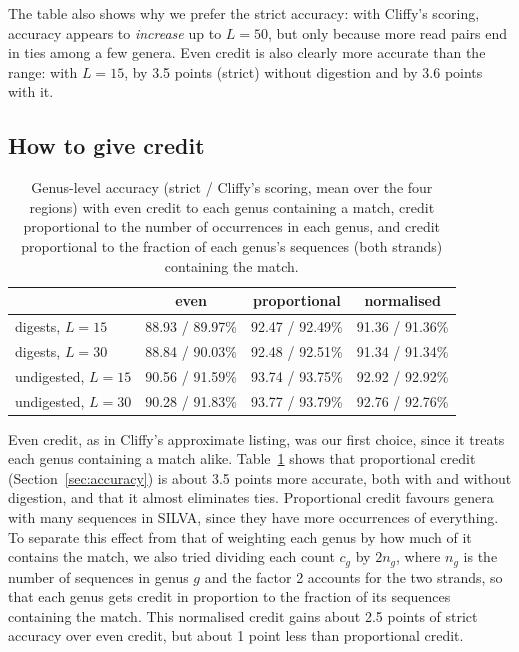 The table also shows why we prefer the strict accuracy: with Cliffy's scoring, accuracy appears to \emph{increase} up to $L = 50$, but only because more read pairs end in ties among a few genera.
Even credit is also clearly more accurate than the range: with $L = 15$, by 3.5 points (strict) without digestion and by 3.6 points with it.

\subsection{How to give credit}
\label{app:freq}
\label{sec:norm}

\begin{table}[t]
\centering
\caption{Genus-level accuracy (strict / Cliffy's scoring, mean over the four regions) with even credit to each genus containing a match, credit proportional to the number of occurrences in each genus, and credit proportional to the fraction of each genus's sequences (both strands) containing the match.}
\label{tab:freq}
\begin{tabular}{lccc}
\toprule
 & even & proportional & normalised \\
\midrule
digests, $L = 15$ & 88.93 / 89.97\% & 92.47 / 92.49\% & 91.36 / 91.36\% \\
digests, $L = 30$ & 88.84 / 90.03\% & 92.48 / 92.51\% & 91.34 / 91.34\% \\
undigested, $L = 15$ & 90.56 / 91.59\% & 93.74 / 93.75\% & 92.92 / 92.92\% \\
undigested, $L = 30$ & 90.28 / 91.83\% & 93.77 / 93.79\% & 92.76 / 92.76\% \\
\bottomrule
\end{tabular}
\end{table}

Even credit, as in Cliffy's approximate listing, was our first choice, since it treats each genus containing a match alike.
Table~\ref{tab:freq} shows that proportional credit (Section~\ref{sec:accuracy}) is about 3.5 points more accurate, both with and without digestion, and that it almost eliminates ties.
Proportional credit favours genera with many sequences in SILVA, since they have more occurrences of everything.
To separate this effect from that of weighting each genus by how much of it contains the match, we also tried dividing each count $c_g$ by $2 n_g$, where $n_g$ is the number of sequences in genus $g$ and the factor 2 accounts for the two strands, so that each genus gets credit in proportion to the fraction of its sequences containing the match.
This normalised credit gains about 2.5 points of strict accuracy over even credit, but about 1 point less than proportional credit.

